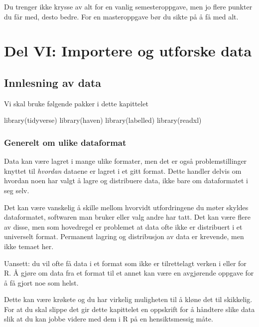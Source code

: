 \documentclass[
  norsk,
  letterpaper,
  DIV=11,
  numbers=noendperiod]{scrreprt}
\newenvironment{Shaded}{\begin{snugshade}}{\end{snugshade}}
\newcommand{\FunctionTok}[1]{\textcolor[rgb]{0.28,0.35,0.67}{#1}}
\newcommand{\NormalTok}[1]{\textcolor[rgb]{0.00,0.23,0.31}{#1}}
\theoremstyle{definition}
\theoremstyle{remark}
\begin{document}
Du trenger ikke krysse av alt for en vanlig semesteroppgave, men jo
flere punkter du får med, desto bedre. For en masteroppgave bør du sikte
på å få med alt.

\part{Del VI: Importere og utforske data}

\chapter{Innlesning av data}\label{innlesning-av-data}

Vi skal bruke følgende pakker i dette kapittelet

\begin{Shaded}
\begin{Highlighting}[]
\FunctionTok{library}\NormalTok{(tidyverse)}
\FunctionTok{library}\NormalTok{(haven)}
\FunctionTok{library}\NormalTok{(labelled)}
\FunctionTok{library}\NormalTok{(readxl)}
\end{Highlighting}
\end{Shaded}

\section{Generelt om ulike
dataformat}\label{generelt-om-ulike-dataformat}

Data kan være lagret i mange ulike formater, men det er også
problemstillinger knyttet til \emph{hvordan} dataene er lagret i et gitt
format. Dette handler delvis om hvordan noen har valgt å lagre og
distribuere data, ikke bare om dataformatet i seg selv.

Det kan være vanskelig å skille mellom hvorvidt utfordringene du møter
skyldes dataformatet, softwaren man bruker eller valg andre har tatt.
Det kan være flere av disse, men som hovedregel er problemet at data
ofte ikke er distribuert i et universelt format. Permanent lagring og
distribusjon av data er krevende, men ikke temaet her.

Uansett: du vil ofte få data i et format som ikke er tilrettelagt verken
i eller for R. Å gjøre om data fra et format til et annet kan være en
avgjørende oppgave for å få gjort noe som helst.

Dette kan være krøkete og du har virkelig muligheten til å kløne det til
skikkelig. For at du skal slippe det gir dette kapittelet en oppskrift
for å håndtere slike data slik at du kan jobbe videre med dem i R på en
hensiktsmessig måte.
\end{document}
